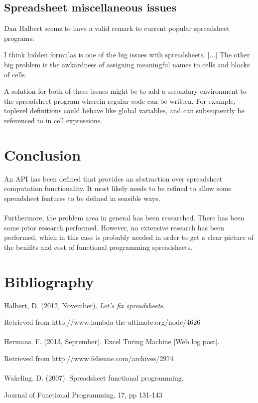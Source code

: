 \documentclass[10pt,a4paper]{article}
\begin{document}
\subsection{Spreadsheet miscellaneous issues}
\label{Spreadsheet miscellaneous issues}
Dan Halbert seems to have a valid remark to current popular spreadsheet programs:
\begin{displayquote}
I think hidden formulas is one of the big issues with spreadsheets. [...] The other big problem
is the awkardness of assigning meaningful names to cells and blocks of cells.
\end{displayquote}
A solution for both of these issues might be to add a secondary environment to the spreadsheet program
wherein regular code can be written. For example, toplevel definitions could behave like global
variables, and can subsequently be referenced to in cell expressions.

\section{Conclusion}
An API has been defined that provides an abstraction over spreadsheet computation functionality.
It most likely needs to be refined to allow some spreadsheet features to be defined in
sensible ways.
\\\\
Furthermore, the problem area in general has been researched. There has been some prior research
performed. However, no extensive research has been performed, which in this case is probably
needed in order to get a clear picture of the benifits and cost of functional programming spreadsheets.

\section*{Bibliography}
Halbert, D. (2012, November). \textit{Let's fix spreadsheets}.

Retrieved from http://www.lambda-the-ultimate.org/node/4626
\\\\
Hermans, F. (2013, September). Excel Turing Machine [Web log post].

Retrieved from http://www.felienne.com/archives/2974
\\\\
Wakeling, D. (2007). Spreadsheet functional programming.

Journal of Functional Programming, 17, pp 131-143
\end{document}
